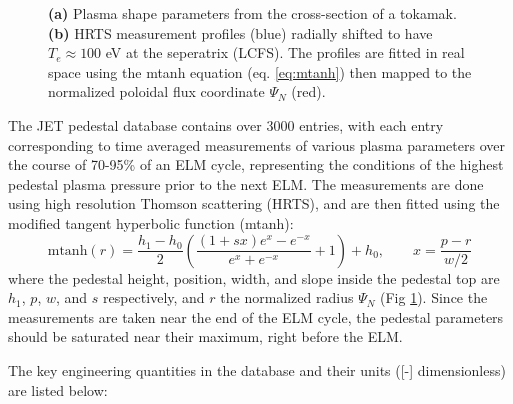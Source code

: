 \documentclass[a4paper, twoside, final, 12pt]{article}
\begin{document}
\begin{figure}
\begin{subfigure}{0.60\linewidth}
		\caption{}
		\label{subfig:mtanhfit}
	\end{subfigure}\hfill
	\caption{ \textbf{(a)} Plasma shape parameters from the cross-section of a tokamak. \textbf{(b)} HRTS measurement profiles (blue) radially shifted to have $T_e \approx 100$ eV at the seperatrix (LCFS). The profiles are fitted in real space using the mtanh equation (eq. \ref{eq:mtanh}) then mapped to the normalized poloidal flux coordinate $\Psi_N$ (red).}
	\label{fig:pedestal_db_figs}
\end{figure}

The JET pedestal database contains over 3000 entries, with each entry corresponding to time averaged measurements of various plasma parameters over the course of 70-95\% of an ELM cycle, representing the conditions of the highest pedestal plasma pressure prior to the next ELM.
The measurements are done using high resolution Thomson scattering (HRTS)\cite{Pasqualotto_2004}, and are then fitted using the modified tangent hyperbolic function (mtanh): 
\begin{equation} \label{eq:mtanh}
\text{mtanh}(r) = \frac{h_1 - h_0}{2} \left( \frac{(1 + sx) e^x - e^{-x}}{e^x + e^{-x}} + 1\right) + h_0 , \quad \quad x=\frac{p-r}{w/2}
\end{equation}
where the pedestal height, position, width, and slope inside the pedestal top are $h_1$, $p$, $w$, and $s$ respectively, and $r$ the normalized radius $\Psi_N$ (Fig \ref{subfig:mtanhfit}). 
Since the measurements are taken near the end of the ELM cycle, the pedestal parameters should be saturated near their maximum, right before the ELM.

The key engineering quantities in the database and their units ([-] dimensionless) are listed below:
\end{document}
